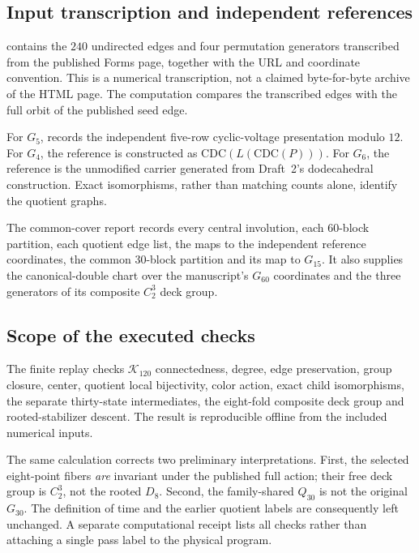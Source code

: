 \subsection{Input transcription and independent references}
 contains the $240$ undirected edges and four permutation generators transcribed from the published Forms page, together with the URL and coordinate convention. This is a numerical transcription, not a claimed byte-for-byte archive of the HTML page. The computation compares the transcribed edges with the full orbit of the published seed edge.

For $G_5$,  records the independent five-row cyclic-voltage presentation modulo $12$. For $G_4$, the reference is constructed as $\mathrm{CDC}(L(\mathrm{CDC}(P)))$. For $G_6$, the reference is the unmodified carrier generated from Draft~2's dodecahedral construction. Exact isomorphisms, rather than matching counts alone, identify the quotient graphs.

The common-cover report records every central involution, each $60$-block partition, each quotient edge list, the maps to the independent reference coordinates, the common $30$-block partition and its map to $G_{15}$. It also supplies the canonical-double chart over the manuscript's $G_{60}$ coordinates and the three generators of its composite $C_2^3$ deck group.

\subsection{Scope of the executed checks}
The finite replay checks $\mathcal K_{120}$ connectedness, degree, edge preservation, group closure, center, quotient local bijectivity, color action, exact child isomorphisms, the separate thirty-state intermediates, the eight-fold composite deck group and rooted-stabilizer descent. The result is reproducible offline from the included numerical inputs.

The same calculation corrects two preliminary interpretations. First, the selected eight-point fibers \emph{are} invariant under the published full action; their free deck group is $C_2^3$, not the rooted $D_8$. Second, the family-shared $Q_{30}$ is not the original $G_{30}$. The definition of time and the earlier quotient labels are consequently left unchanged. A separate computational receipt lists all checks rather than attaching a single pass label to the physical program.
